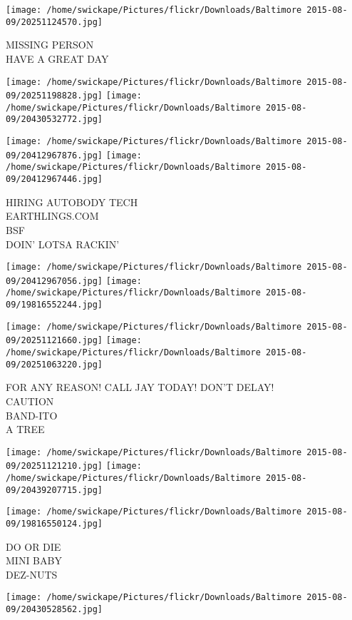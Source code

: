 \documentclass[10pt,letterpaper]{article}
\begin{document}
\vspace{0.25in}
\texttt{[image: /home/swickape/Pictures/flickr/Downloads/Baltimore 2015-08-09/20251124570.jpg]}

MISSING PERSON\\
HAVE A GREAT DAY
\pagebreak

\texttt{[image: /home/swickape/Pictures/flickr/Downloads/Baltimore 2015-08-09/20251198828.jpg]}
\texttt{[image: /home/swickape/Pictures/flickr/Downloads/Baltimore 2015-08-09/20430532772.jpg]}

\texttt{[image: /home/swickape/Pictures/flickr/Downloads/Baltimore 2015-08-09/20412967876.jpg]}
\texttt{[image: /home/swickape/Pictures/flickr/Downloads/Baltimore 2015-08-09/20412967446.jpg]}

HIRING AUTOBODY TECH\\
EARTHLINGS.COM\\
BSF\\
DOIN' LOTSA RACKIN'
\pagebreak

\texttt{[image: /home/swickape/Pictures/flickr/Downloads/Baltimore 2015-08-09/20412967056.jpg]}
\texttt{[image: /home/swickape/Pictures/flickr/Downloads/Baltimore 2015-08-09/19816552244.jpg]}

\texttt{[image: /home/swickape/Pictures/flickr/Downloads/Baltimore 2015-08-09/20251121660.jpg]}
\texttt{[image: /home/swickape/Pictures/flickr/Downloads/Baltimore 2015-08-09/20251063220.jpg]}

FOR ANY REASON!  CALL JAY TODAY!  DON'T DELAY!\\
CAUTION\\
BAND{-}ITO\\
A TREE
\pagebreak

\texttt{[image: /home/swickape/Pictures/flickr/Downloads/Baltimore 2015-08-09/20251121210.jpg]}
\texttt{[image: /home/swickape/Pictures/flickr/Downloads/Baltimore 2015-08-09/20439207715.jpg]}

\texttt{[image: /home/swickape/Pictures/flickr/Downloads/Baltimore 2015-08-09/19816550124.jpg]}

DO OR DIE\\
MINI BABY\\
DEZ{-}NUTS
\pagebreak

\texttt{[image: /home/swickape/Pictures/flickr/Downloads/Baltimore 2015-08-09/20430528562.jpg]}
\end{document}
